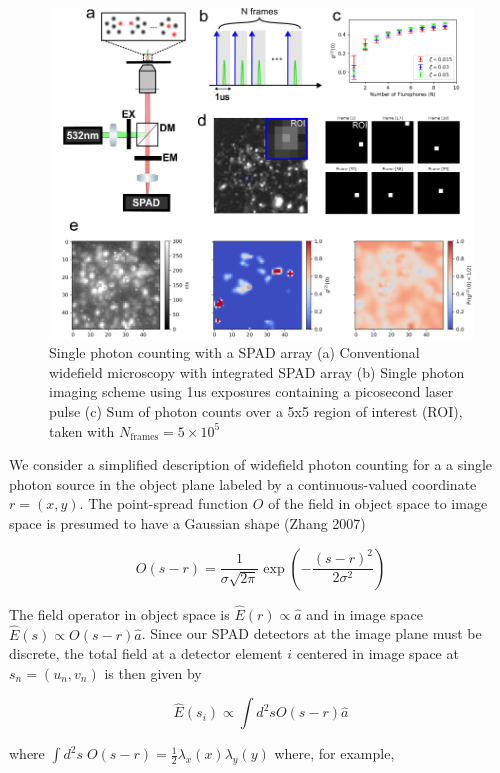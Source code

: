 \documentclass[a4paper, twocolumn, superscriptaddress,prl]{revtex4}  %
\begin{document}
\begin{figure}
\includegraphics[width=14cm]{Figure-0.png}
\caption{Single photon counting with a SPAD array (a) Conventional widefield microscopy with integrated SPAD array (b) Single photon imaging scheme using 1us exposures containing a picosecond laser pulse (c) Sum of photon counts over a 5x5 region of interest (ROI), taken with $N_{\mathrm{frames}}=5\times 10^{5}$}
\end{figure}    

We consider a simplified description of widefield photon counting for a a single photon source in the object plane labeled by a continuous-valued coordinate $r=(x,y)$. The point-spread function $O$ of the field in object space to image space is presumed to have a Gaussian shape (Zhang 2007)

\begin{equation}
O(s-r) = \frac{1}{\sigma\sqrt{2\pi}}\exp\left(-\frac{(s-r)^2}{2\sigma^2}\right)
\end{equation}

The field operator in object space is $\hat{E}(r) \propto \hat{a}$ and in image space $\hat{E}(s) \propto O(s-r)\hat{a}$. Since our SPAD detectors at the image plane must be discrete, the total field at a detector element $i$ centered in image space at $s_n=(u_n,v_n)$ is then given by

\begin{equation}
\hat{E}(s_i) \propto \int d^{2}s O(s-r)\hat{a}
\end{equation}

where $\int d^2 s \; O(s-r) = \frac{1}{2}\lambda_{x}(x) \lambda_{y}(y)$ where, for example,
\end{document}
